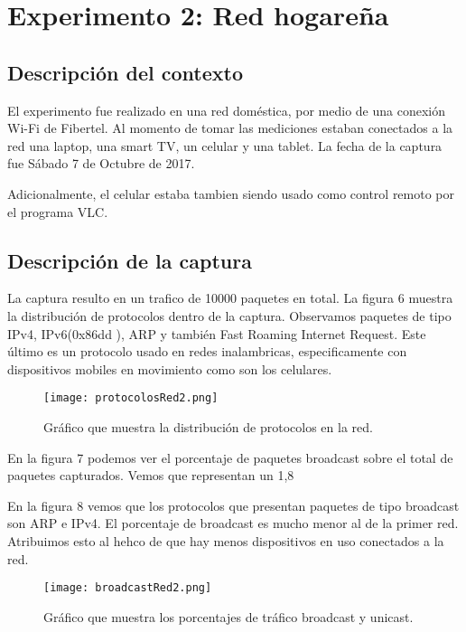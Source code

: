 \section{Experimento 2: Red hogareña}

\subsection{Descripción del contexto}

El experimento fue realizado en una red doméstica, por medio de una conexión Wi-Fi de Fibertel.
Al momento de tomar las mediciones estaban conectados a la red una laptop, una smart TV, un celular y una tablet. 
La fecha de la captura fue Sábado 7 de Octubre de 2017. 

Adicionalmente, el celular estaba tambien siendo usado como control remoto por el programa VLC.

\subsection{Descripción de la captura}

La captura resulto en un trafico de 10000 paquetes en total. 
La figura 6 muestra la distribución de protocolos dentro de la captura. 
Observamos paquetes de tipo IPv4, IPv6(0x86dd ), ARP y también Fast Roaming Internet Request. Este último es un protocolo usado en redes inalambricas, especificamente con dispositivos mobiles en movimiento como son los celulares.
\begin{figure}[H]
\centering
\texttt{[image: protocolosRed2.png]}
\caption{Gráfico que muestra la distribución de protocolos en la red.}
\label{broadcast2}
\end{figure}

En la figura 7 podemos ver el porcentaje de paquetes broadcast sobre el total de paquetes capturados. 
Vemos que representan un 1,8%

En la figura 8 vemos que los protocolos que presentan paquetes de tipo broadcast son ARP e IPv4. 
El porcentaje de broadcast es mucho menor al de la primer red. Atribuimos esto al hehco de que hay menos dispositivos en uso conectados a la red.

\begin{figure}[H]
\centering
\texttt{[image: broadcastRed2.png]}
\caption{Gráfico que muestra los porcentajes de tráfico broadcast y unicast.}
\label{broadcast2}
\end{figure}

